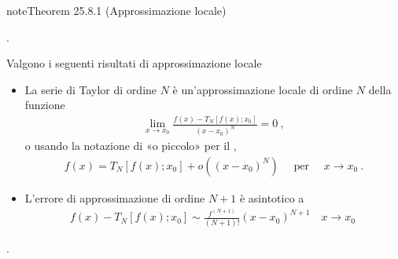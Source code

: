 \documentclass[letterpaper,10pt,italian]{jupyterBook}
\begin{document}
\begin{sphinxadmonition}{note}{Theorem 25.8.1 (Approssimazione locale)}



\sphinxAtStartPar
{} .

\sphinxAtStartPar
Valgono i seguenti risultati di approssimazione locale
\begin{itemize}
\item {} 
\sphinxAtStartPar
La serie di Taylor di ordine \(N\) è un’approssimazione locale di ordine \(N\) della funzione
\begin{equation*}
\begin{split}\lim_{x \rightarrow x_0} \frac{f(x) - T_N[f(x); x_0]}{(x-x_0)^N} = 0 \ , \end{split}
\end{equation*}
\sphinxAtStartPar
o usando la notazione di «o piccolo» per il {\hyperref[\detokenize{ch/infinitesimal_calculus/analysis:infinitesimal-calculus-limits-infinite-simal}]{}},
\begin{equation*}
\begin{split}f(x) = T_N[f(x); x_0] + o\left((x-x_0)^N\right) \quad \text{ per } \quad x \rightarrow x_0 \ .\end{split}
\end{equation*}
\item {} 
\sphinxAtStartPar
L’errore di approssimazione di ordine \(N+1\) è asintotico a
\begin{equation*}
\begin{split}f(x) - T_N[f(x); x_0] \sim \frac{f^{(N+1)}}{(N+1)!} (x - x_0)^{N+1} \quad x \rightarrow x_0 \ \end{split}
\end{equation*}
\end{itemize}
\end{sphinxadmonition}

\sphinxAtStartPar
{\hyperref[\detokenize{ch/infinitesimal_calculus/derivatives-notes:infinitesimal-calculus-derivatives-taylor-notes}]{}}.
\end{document}
